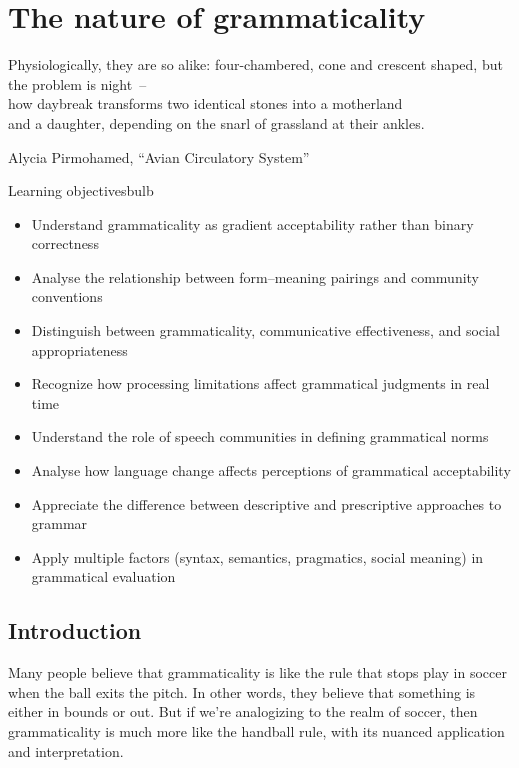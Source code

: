 \chapter{The nature of grammaticality} \label{ch:grammaticality}

\epigraph{Physiologically, they are so alike: four-chambered, cone and crescent shaped, but\\
the problem is night~--\\
how daybreak transforms two identical stones into a motherland\\
and a daughter, depending on the snarl of grassland at their ankles.}{Alycia Pirmohamed, \enquote{Avian Circulatory System}}

\begin{tblsframedsymbol}{Learning objectives}{bulb}
\begin{itemize}[noitemsep, leftmargin=*]
    \item Understand grammaticality as gradient acceptability rather than binary correctness
    \item Analyse the relationship between form--meaning pairings and community conventions
    \item Distinguish between grammaticality, communicative effectiveness, and social appropriateness
    \item Recognize how processing limitations affect grammatical judgments in real time
    \item Understand the role of speech communities in defining grammatical norms
    \item Analyse how language change affects perceptions of grammatical acceptability
    \item Appreciate the difference between descriptive and prescriptive approaches to grammar
    \item Apply multiple factors (syntax, semantics, pragmatics, social meaning) in grammatical evaluation
\end{itemize}
\end{tblsframedsymbol}


\section{Introduction} 
Many people believe that grammaticality is like the rule that stops play in soccer when the ball exits the pitch. In other words, they believe that something is either in bounds or out. But if we're analogizing to the realm of soccer, then grammaticality is much more like the handball rule, with its nuanced application and interpretation.

